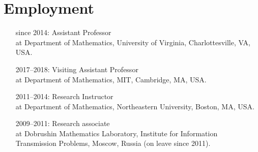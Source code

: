 \documentclass[letterpaper,11pt]{article}
\begin{document}
\section*{Employment}

\begin{itemize}
	\item
	      [since 2014:]
	      Assistant Professor\\ at Department of Mathematics, University
	      of Virginia, Charlottesville, VA, USA.
	\item
	      [2017--2018:]
	      Visiting Assistant Professor\\ at Department of Mathematics, MIT, 
	      Cambridge, MA, USA.
	\item
	      [2011--2014:]
	      Research Instructor\\ at Department of Mathematics, Northeastern
	      University, Boston, MA, USA.
	\item
	      [2009--2011:]
	      Research associate\\ at Dobrushin Mathematics Laboratory,
	      Institute for Information Transmission Problems, Moscow, Russia (on leave
	      since 2011).
\end{itemize}
\end{document}

